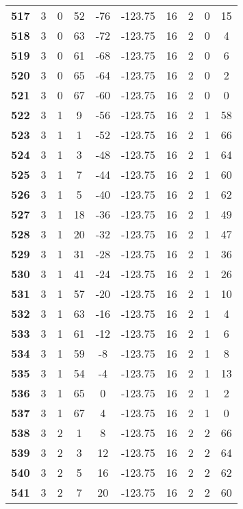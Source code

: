 \documentclass[12pt,letterpaper, onecolumn]{exam}
\begin{document}
\begin{longtable}{cccccccccc}
    \textbf{517} & 3 & 0 & 52 & -76 & -123.75 & 16 & 2 & 0 & 15 \\ 
    \textbf{518} & 3 & 0 & 63 & -72 & -123.75 & 16 & 2 & 0 & 4 \\ 
    \textbf{519} & 3 & 0 & 61 & -68 & -123.75 & 16 & 2 & 0 & 6 \\ 
    \textbf{520} & 3 & 0 & 65 & -64 & -123.75 & 16 & 2 & 0 & 2 \\ 
    \textbf{521} & 3 & 0 & 67 & -60 & -123.75 & 16 & 2 & 0 & 0 \\ 
    \textbf{522} & 3 & 1 & 9 & -56 & -123.75 & 16 & 2 & 1 & 58 \\ 
    \textbf{523} & 3 & 1 & 1 & -52 & -123.75 & 16 & 2 & 1 & 66 \\ 
    \textbf{524} & 3 & 1 & 3 & -48 & -123.75 & 16 & 2 & 1 & 64 \\      \hline
    \textbf{525} & 3 & 1 & 7 & -44 & -123.75 & 16 & 2 & 1 & 60 \\ 
    \textbf{526} & 3 & 1 & 5 & -40 & -123.75 & 16 & 2 & 1 & 62 \\ 
    \textbf{527} & 3 & 1 & 18 & -36 & -123.75 & 16 & 2 & 1 & 49 \\ 
    \textbf{528} & 3 & 1 & 20 & -32 & -123.75 & 16 & 2 & 1 & 47 \\ 
    \textbf{529} & 3 & 1 & 31 & -28 & -123.75 & 16 & 2 & 1 & 36 \\ 
    \textbf{530} & 3 & 1 & 41 & -24 & -123.75 & 16 & 2 & 1 & 26 \\ 
    \textbf{531} & 3 & 1 & 57 & -20 & -123.75 & 16 & 2 & 1 & 10 \\ 
    \textbf{532} & 3 & 1 & 63 & -16 & -123.75 & 16 & 2 & 1 & 4 \\ 
    \textbf{533} & 3 & 1 & 61 & -12 & -123.75 & 16 & 2 & 1 & 6 \\ 
    \textbf{534} & 3 & 1 & 59 & -8 & -123.75 & 16 & 2 & 1 & 8 \\ 
    \textbf{535} & 3 & 1 & 54 & -4 & -123.75 & 16 & 2 & 1 & 13 \\ 
    \textbf{536} & 3 & 1 & 65 & 0 & -123.75 & 16 & 2 & 1 & 2 \\ 
    \textbf{537} & 3 & 1 & 67 & 4 & -123.75 & 16 & 2 & 1 & 0 \\ 
    \textbf{538} & 3 & 2 & 1 & 8 & -123.75 & 16 & 2 & 2 & 66 \\ 
    \textbf{539} & 3 & 2 & 3 & 12 & -123.75 & 16 & 2 & 2 & 64 \\ 
    \textbf{540} & 3 & 2 & 5 & 16 & -123.75 & 16 & 2 & 2 & 62 \\ 
    \textbf{541} & 3 & 2 & 7 & 20 & -123.75 & 16 & 2 & 2 & 60 \\ 

\end{longtable}
\end{document}

